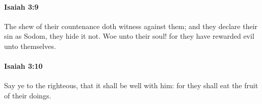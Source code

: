 		\paragraph{Isaiah 3:9} %
			\label{ISAIAH-3-9}

			The shew of their countenance doth witness against them; and they declare their sin as Sodom, they hide it not. Woe unto their soul! for they have rewarded evil unto themselves.


		\paragraph{Isaiah 3:10} %
			\label{ISAIAH-3-10}

			Say ye to the righteous, that it shall be well with him: for they shall eat the fruit of their doings.


